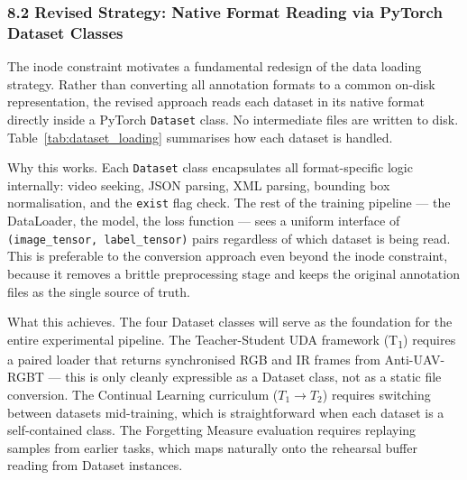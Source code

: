 \subsubsection*{8.2 Revised Strategy: Native Format Reading via PyTorch Dataset Classes}

The inode constraint motivates a fundamental redesign of the data
loading strategy. Rather than converting all annotation formats to a
common on-disk representation, the revised approach reads each
dataset in its native format directly inside a PyTorch
\texttt{Dataset} class. No intermediate files are written to disk.
Table~\ref{tab:dataset_loading} summarises how each dataset is handled.

\begin{table}[h]
\centering
\caption{Native-format loading strategy per dataset.}
\label{tab:dataset_loading}
\end{table}

Why this works.
Each \texttt{Dataset} class encapsulates all format-specific logic
internally: video seeking, JSON parsing, XML parsing, bounding box
normalisation, and the \texttt{exist} flag check. The rest of the
training pipeline — the DataLoader, the model, the loss function —
sees a uniform interface of \texttt{(image\_tensor, label\_tensor)}
pairs regardless of which dataset is being read. This is preferable
to the conversion approach even beyond the inode constraint, because
it removes a brittle preprocessing stage and keeps the original
annotation files as the single source of truth.

What this achieves.
The four Dataset classes will serve as the foundation for the entire
experimental pipeline. The Teacher-Student UDA framework (T\textsubscript{1})
requires a paired loader that returns synchronised RGB and IR frames
from Anti-UAV-RGBT — this is only cleanly expressible as a Dataset
class, not as a static file conversion. The Continual Learning
curriculum ($T_1 \to T_2$) requires switching between datasets
mid-training, which is straightforward when each dataset is a
self-contained class. The Forgetting Measure evaluation requires
replaying samples from earlier tasks, which maps naturally onto
the rehearsal buffer reading from Dataset instances.

